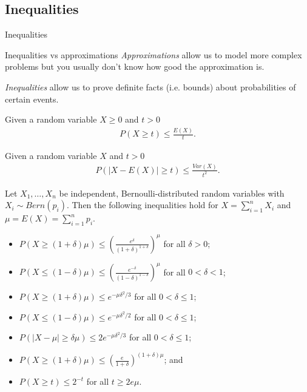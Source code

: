 \documentclass{beamer}
\begin{document}
\subsection{Inequalities}
\begin{frame}{Inequalities}
    \begin{block}{Inequalities vs approximations}
        \textit{Approximations} allow us to model more complex problems but you usually don't know how good the approximation is.\par\pause
        \textit{Inequalities} allow us to prove definite facts (i.e. bounds) about probabilities of certain events.
    \end{block}
\end{frame}

\begin{frame}
    \begin{definition}[Markov]
        Given a random variable $X \geq 0$ and $t > 0$
        \begin{align*}
            P(X \geq t) \leq \frac{E(X)}{t}.
        \end{align*}
    \end{definition}\pause
    \begin{definition}[Chebyshev]
        Given a random variable $X$ and $t > 0$
        \begin{align*}
            P(|X - E(X)| \geq t) \leq \frac{Var(X)}{t^2}.
        \end{align*}
    \end{definition}
\end{frame}

\begin{frame}
    \begin{definition}[Chernoff]
        Let $X_1, \dots, X_n$ be independent, Bernoulli-distributed random variables with $X_i \sim Bern(p_i)$. Then the following inequalities hold for $X = \sum_{i=1}^n X_i$ and $\mu = E(X) = \sum_{i=1}^n p_i$.\pause
        \begin{itemize}
            \item $P(X \geq (1 + \delta) \mu) \leq \left(\frac{e^{\delta}}{(1 + \delta)^{1 + \delta}}\right)^{\mu}$ for all $\delta > 0$;
            \item $P(X \leq (1 - \delta) \mu) \leq \left(\frac{e^{- \delta}}{(1 - \delta)^{1 - \delta}}\right)^{\mu}$ for all $0 < \delta < 1$\pause;
            \item $P(X \geq (1 + \delta) \mu) \leq e^{- \mu \delta^2 / 3}$ for all $0 < \delta \leq 1$;
            \item $P(X \leq (1 - \delta) \mu) \leq e^{- \mu \delta^2 / 2}$ for all $0 < \delta \leq 1$;
            \item $P(|X - \mu| \geq \delta \mu) \leq 2 e^{- \mu \delta^2 / 3}$ for all $0 < \delta \leq 1$;
            \item $P(X \geq (1 + \delta) \mu) \leq \left(\frac{e}{1 + \delta}\right)^{(1 + \delta) \mu}$; and
            \item $P(X \geq t) \leq 2^{-t}$ for all $t \geq 2 e \mu$.
        \end{itemize}
    \end{definition}
\end{frame}
\end{document}
